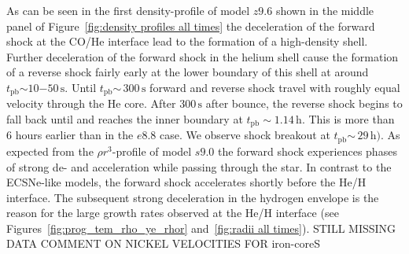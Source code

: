 \documentclass[fleqn,usenatbib]{mnras}
\newcommand{\tpb}{\ensuremath{t_{\text{pb}}}}
\newcommand{\s}{\ensuremath{\text{s}}}
\newcommand{\COM}[1]{{\color{orange}#1}}
\begin{document}
As can be seen in the first density-profile of model $z9.6$ shown in the middle panel of Figure~\ref{fig:density profiles all times} the deceleration of the forward shock at the CO/He interface lead to the formation of a high-density shell. 
Further deceleration of the forward shock in the helium shell cause the formation of a reverse shock fairly early at the lower boundary of this shell at around $\tpb\mathord{\sim} 10\mathord{-}50\,\s$. Until $\tpb\mathord{\sim}\, 300\,\s$ forward and reverse shock travel with roughly equal velocity through the He core. 
After $300\,\s$ after bounce, the reverse shock begins to fall back until and reaches the inner boundary at $t_{\mathrm{pb}}\sim 1.14\,\text{h}$. This is more than 6 hours earlier than in the $e8.8$ case. We observe shock breakout at $\tpb\mathord{\sim}\, 29\,\mathrm{h})$.
As expected from the $\rho r^3$-profile of model $s9.0$ the forward shock experiences phases of strong de- and acceleration while passing through the star. In contrast to the ECSNe-like models, the forward shock accelerates shortly before the He/H interface. The subsequent strong deceleration in the hydrogen envelope is the reason for the large growth rates observed at the He/H interface (see Figures~\ref{fig:prog_tem_rho_ye_rhor} and~\ref{fig:radii all times}). 
\COM{STILL MISSING DATA}
\COM{COMMENT ON NICKEL VELOCITIES FOR iron-coreS}
\end{document}
